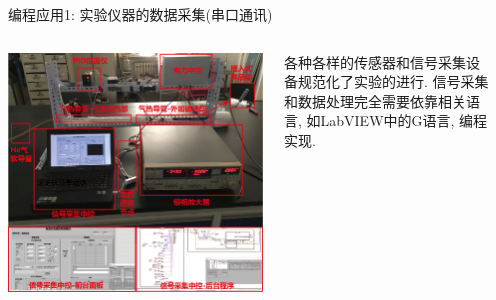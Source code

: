 \documentclass{beamer}
\begin{document}
    \begin{frame}{编程应用1: 实验仪器的数据采集(串口通讯)}
      \begin{columns}
        \begin{column}{0.8\textwidth}
          \centering
          \begin{tcolorbox}[beamer,width=0.8\textwidth,arc=0pt,boxsep=0pt,left=0pt,right=0pt,top=0pt,bottom=0pt]
            \includegraphics[width=\textwidth]{figure/dc.png}
          \end{tcolorbox}
        \end{column}
        \begin{column}{0.16\textwidth}
          \centering
          \begin{block}{}\small
            各种各样的传感器和信号采集设备规范化了实验的进行. 信号采集和数据处理完全需要依靠相关语言, 如LabVIEW中的G语言, 编程实现. 
          \end{block}
        \end{column}
        \begin{column}{0.1\textwidth}
        \end{column}
      \end{columns}
    \end{frame}
\end{document}
